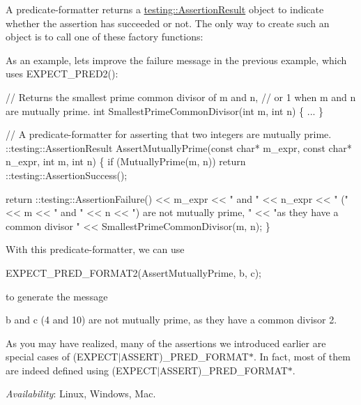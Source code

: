 A predicate-\/formatter returns a {\ttfamily \hyperlink{classtesting_1_1_assertion_result}{testing\+::\+Assertion\+Result}} object to indicate whether the assertion has succeeded or not. The only way to create such an object is to call one of these factory functions\+:

As an example, let\textquotesingle{}s improve the failure message in the previous example, which uses {\ttfamily E\+X\+P\+E\+C\+T\+\_\+\+P\+R\+E\+D2()}\+:


\begin{DoxyCode}
// Returns the smallest prime common divisor of m and n,
// or 1 when m and n are mutually prime.
int SmallestPrimeCommonDivisor(int m, int n) \{ ... \}

// A predicate-formatter for asserting that two integers are mutually prime.
::testing::AssertionResult AssertMutuallyPrime(const char* m\_expr,
                                               const char* n\_expr,
                                               int m,
                                               int n) \{
  if (MutuallyPrime(m, n))
    return ::testing::AssertionSuccess();

  return ::testing::AssertionFailure()
      << m\_expr << " and " << n\_expr << " (" << m << " and " << n
      << ") are not mutually prime, " << "as they have a common divisor "
      << SmallestPrimeCommonDivisor(m, n);
\}
\end{DoxyCode}


With this predicate-\/formatter, we can use


\begin{DoxyCode}
EXPECT\_PRED\_FORMAT2(AssertMutuallyPrime, b, c);
\end{DoxyCode}


to generate the message


\begin{DoxyPre}
b and c (4 and 10) are not mutually prime, as they have a common divisor 2.~\newline

\end{DoxyPre}


As you may have realized, many of the assertions we introduced earlier are special cases of {\ttfamily (E\+X\+P\+E\+C\+T$\vert$\+A\+S\+S\+E\+RT)\+\_\+\+P\+R\+E\+D\+\_\+\+F\+O\+R\+M\+A\+T$\ast$}. In fact, most of them are indeed defined using {\ttfamily (E\+X\+P\+E\+C\+T$\vert$\+A\+S\+S\+E\+RT)\+\_\+\+P\+R\+E\+D\+\_\+\+F\+O\+R\+M\+A\+T$\ast$}.

{\itshape Availability}\+: Linux, Windows, Mac.

